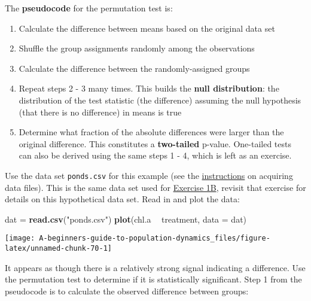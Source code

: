 \documentclass[]{book}
\newenvironment{Shaded}{\begin{snugshade}}{\end{snugshade}}
\newcommand{\DataTypeTok}[1]{\textcolor[rgb]{0.13,0.29,0.53}{#1}}
\newcommand{\KeywordTok}[1]{\textcolor[rgb]{0.13,0.29,0.53}{\textbf{#1}}}
\newcommand{\NormalTok}[1]{#1}
\newcommand{\OperatorTok}[1]{\textcolor[rgb]{0.81,0.36,0.00}{\textbf{#1}}}
\newcommand{\StringTok}[1]{\textcolor[rgb]{0.31,0.60,0.02}{#1}}
\providecommand{\tightlist}{%
  \setlength{\itemsep}{0pt}\setlength{\parskip}{0pt}}
\begin{document}
The \textbf{pseudocode} for the permutation test is:

\begin{enumerate}
\def\labelenumi{\arabic{enumi}.}
\tightlist
\item
  Calculate the difference between means based on the original data set
\item
  Shuffle the group assignments randomly among the observations
\item
  Calculate the difference between the randomly-assigned groups
\item
  Repeat steps 2 - 3 many times. This builds the \textbf{null distribution}: the distribution of the test statistic (the difference) assuming the null hypothesis (that there is no difference) in means is true
\item
  Determine what fraction of the absolute differences were larger than the original difference. This constitutes a \textbf{two-tailed} p-value. One-tailed tests can also be derived using the same steps 1 - 4, which is left as an exercise.
\end{enumerate}

Use the data set \texttt{ponds.csv} for this example (see the \protect\hyperlink{data-sets}{instructions} on acquiring data files). This is the same data set used for \protect\hyperlink{ex1b}{Exercise 1B}, revisit that exercise for details on this hypothetical data set. Read in and plot the data:

\begin{Shaded}
\begin{Highlighting}[]
\NormalTok{dat =}\StringTok{ }\KeywordTok{read.csv}\NormalTok{(}\StringTok{"ponds.csv"}\NormalTok{)}
\KeywordTok{plot}\NormalTok{(chl.a }\OperatorTok{~}\StringTok{ }\NormalTok{treatment, }\DataTypeTok{data =}\NormalTok{ dat)}
\end{Highlighting}
\end{Shaded}

\begin{center}\texttt{[image: A-beginners-guide-to-population-dynamics\_files/figure-latex/unnamed-chunk-70-1]} \end{center}

It appears as though there is a relatively strong signal indicating a difference. Use the permutation test to determine if it is statistically significant. Step 1 from the pseudocode is to calculate the observed difference between groups:

\begin{Shaded}
\end{Shaded}
\end{document}
